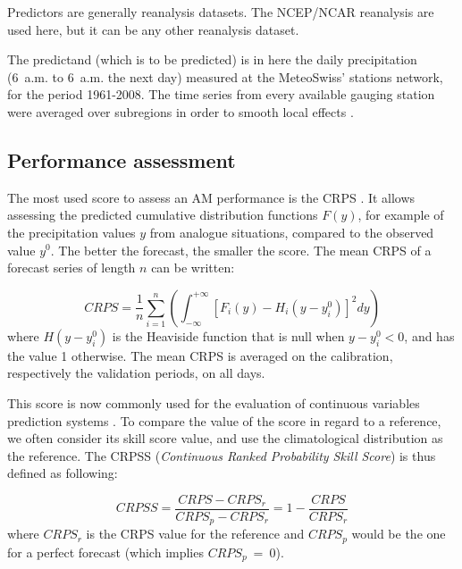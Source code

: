 \documentclass[5p]{elsarticle}
\begin{document}
Predictors are generally reanalysis datasets. The NCEP/NCAR reanalysis \citep[6-hourly, 17 pressure levels at a resolution of 2.5\degree, see][]{Kalnay1996} are used here, but it can be any other reanalysis dataset.

The predictand (which is to be predicted) is in here the daily precipitation (6~a.m. to 6~a.m. the next day) measured at the MeteoSwiss' stations network, for the period 1961-2008. The time series from every available gauging station were averaged over subregions in order to smooth local effects \citep{Obled2002, Marty2012}.


\subsection{Performance assessment}
\label{sec:score}

The most used score to assess an AM performance is the CRPS \citep[Continuous Ranked Probability Score,][]{Brown1974, Matheson1976, Hersbach2000}. It allows assessing the predicted cumulative distribution functions $F(y)$, for example of the precipitation values $y$ from analogue situations, compared to the observed value $y^{0}$. The better the forecast, the smaller the score. The mean CRPS of a forecast series of length $n$ can be written:

\begin{equation}
\label{eq:CRPS}
CRPS = \frac{1}{n} \sum_{i=1}^{n} \left(  \int_{-\infty}^{+\infty} \left[ F_{i}(y)-H_{i}(y-y_{i}^{0})\right]^{2} dy \right) 
\end{equation}
where $H(y-y_{i}^{0})$ is the Heaviside function that is null when $y-y_{i}^{0}<0$, and has the value 1 otherwise. The mean CRPS is averaged on the calibration, respectively the validation periods, on all days.

This score is now commonly used for the evaluation of continuous variables prediction systems \citep{Casati2008, Marty2010}. To compare the value of the score in regard to a reference, we often consider its skill score value, and use the climatological distribution as the reference. The CRPSS (\textit{Continuous Ranked Probability Skill Score}) is thus defined as following:

\begin{equation}
\label{eq:CRPSS}
CRPSS = \frac{CRPS-CRPS_{r}}{CRPS_{p}-CRPS_{r}} = 1-\frac{CRPS}{CRPS_{r}}
\end{equation}
where $CRPS_{r}$ is the CRPS value for the reference and $CRPS_{p}$ would be the one for a perfect forecast (which implies $CRPS_{p}~=~0$).
\end{document}
